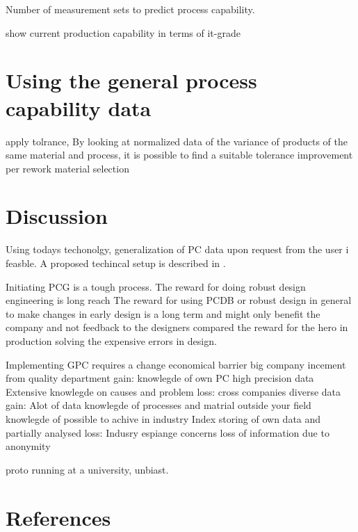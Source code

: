 \documentclass[aip,amsmath, reprint, author-year]{revtex4-1}
\begin{document}
Number of measurement sets to predict process capability.  


show current production capability in terms of it-grade

\section{Using the general process capability data}
apply tolrance, By looking at normalized data of the variance of products of the same material and process, it is possible to find a suitable tolerance
improvement per rework
material selection


\section{Discussion}

Using todays techonolgy, generalization of PC data upon request from the user i feasble. A proposed techincal setup is described in \cite{OkholmRask}.

Initiating PCG is a tough process. 
The reward for doing robust design engineering is long reach
The reward for using PCDB or robust design in general to make changes in early design is a long term and might only benefit the company and not feedback to the designers compared the reward for the hero in production solving the expensive errors in design.

Implementing GPC requires a change
	economical barrier
		big company
			incement from quality department
			gain: 	knowlegde of own PC
					high precision data
					Extensive knowlegde on causes and problem
			loss:
		cross companies
			diverse data
			gain:		Alot of data
					knowlegde of processes and matrial outside your field
					knowlegde of possible to achive in industry
					Index storing of own data and partially analysed
			loss:		Indusry espiange concerns
					loss of information due to anonymity

proto running at a university, unbiast.


\section*{References}

\end{document}
